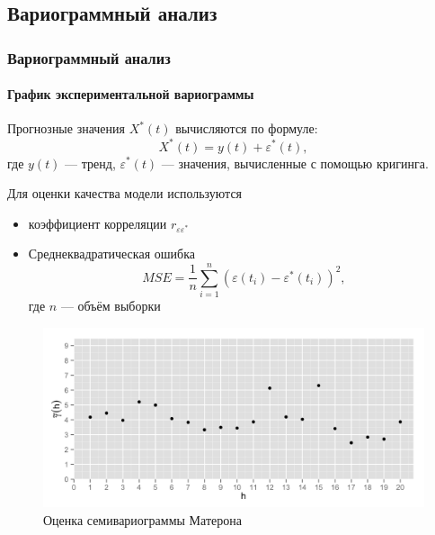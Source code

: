 \documentclass{beamer}
\begin{document}
\subsection{Вариограммный анализ}
\begin{frame}
  \frametitle{Вариограммный анализ}
  \framesubtitle{График экспериментальной вариограммы}
  \begin{multicols}{2}
    Прогнозные значения $ X^{*}(t) $ вычисляются по формуле:
    \begin{equation*}
      X^{*}(t) = y(t) + \varepsilon^{*}(t),
    \end{equation*}
    где $ y(t) $ --- тренд, $ \varepsilon^{*}(t) $ --- значения, вычисленные с помощью кригинга.

    \medskip

    Для оценки качества модели используются
    \begin{itemize}
      \item коэффициент корреляции $ r_{\varepsilon\varepsilon^{*}} $
      \item Среднеквадратическая ошибка
        \begin{equation}
        \label{eq:mse}
          MSE = \frac{1}{n} \sum_{i=1}^{n} (\varepsilon(t_i) - \varepsilon^{*}(t_i))^2,
        \end{equation}
        где $ n $ --- объём выборки
    \end{itemize}

  \columnbreak
    \begin{figure}[h]
    \includegraphics[width=1\linewidth]{../../figures/variogram/lin-variogram.png}
    \caption{Оценка семивариограммы Матерона}
  \end{figure}
  \end{multicols}
\end{frame}
\end{document}
